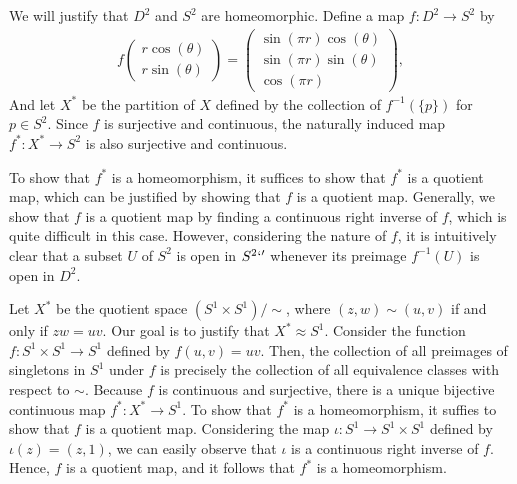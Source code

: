 \begin{exmp}
    We will justify that $D^2$ and $S^2$ are homeomorphic.
    Define a map $f: D^2\rightarrow S^2$ by
    \begin{align*}
        f
        \begin{pmatrix}
            r\cos(\theta)\\
            r\sin(\theta)
        \end{pmatrix}
        =
        \begin{pmatrix}
            \sin(\pi r)\cos(\theta)\\
            \sin(\pi r)\sin(\theta)\\
            \cos(\pi r)
        \end{pmatrix},
    \end{align*}
    And let $X^*$ be the partition of $X$ defined by the collection of $f^{-1}(\{p\})$ for $p\in S^2$.
    Since $f$ is surjective and continuous, the naturally induced map $f^*: X^*\rightarrow S^2$ is also surjective and continuous.

    To show that $f^*$ is a homeomorphism, it suffices to show that $f^*$ is a quotient map, which can be justified by showing that $f$ is a quotient map.
    Generally, we show that $f$ is a quotient map by finding a continuous right inverse of $f$, which is quite difficult in this case.
    However, considering the nature of $f$, it is intuitively clear that a subset $U$ of $S^2$ is open in $S^2`'$ whenever its preimage $f^{-1}(U)$ is open in $D^2$.
\end{exmp}
\begin{exmp}
    Let $X^*$ be the quotient space $(S^1\times S^1)/\sim$, where $(z, w)\sim(u, v)$ if and only if $zw=uv$.
    Our goal is to justify that $X^*\approx S^1$.
    Consider the function $f: S^1\times S^1\rightarrow S^1$ defined by $f(u, v)=uv$.
    Then, the collection of all preimages of singletons in $S^1$ under $f$ is precisely the collection of all equivalence classes with respect to $\sim$.
    Because $f$ is continuous and surjective, there is a unique bijective continuous map $f^*: X^*\rightarrow S^1$.
    To show that $f^*$ is a homeomorphism, it suffies to show that $f$ is a quotient map.
    Considering the map $\iota: S^1\rightarrow S^1\times S^1$ defined by $\iota(z)=(z, 1)$, we can easily observe that $\iota$ is a continuous right inverse of $f$.
    Hence, $f$ is a quotient map, and it follows that $f^*$ is a homeomorphism.
\end{exmp}

